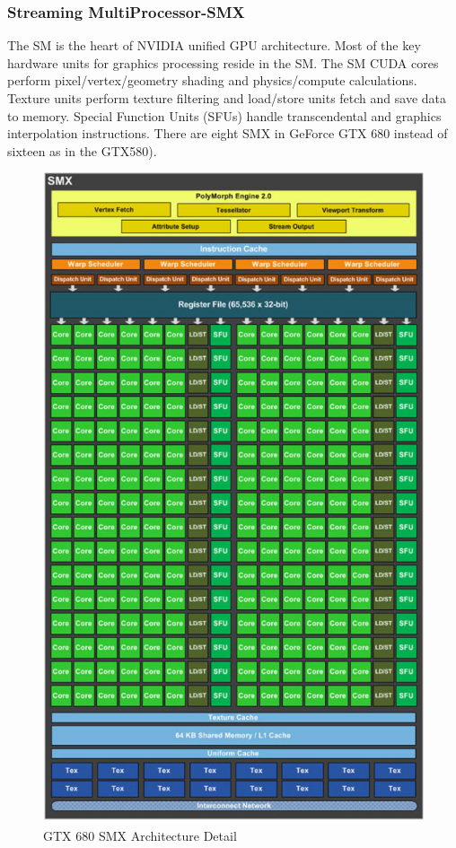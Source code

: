 \subsubsection{Streaming MultiProcessor-SMX}
The SM is the heart of NVIDIA unified GPU architecture. Most of the key
hardware units for graphics processing reside in the SM. The SM CUDA cores perform pixel/vertex/geometry shading and
physics/compute calculations. Texture units perform texture filtering and load/store units fetch and
save data to memory. Special Function Units (SFUs) handle transcendental and graphics interpolation
instructions. There are eight SMX in GeForce GTX 680 instead of sixteen as in
the GTX580).
\begin{figure}
\includegraphics[scale=0.5]{./images/gtx680_SMX}
\caption{GTX 680 SMX Architecture Detail}\label{gtx680_SMX}
\end{figure}
